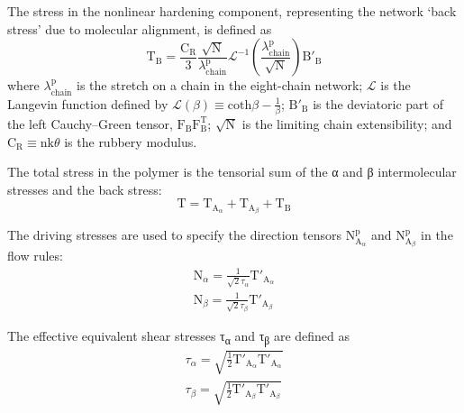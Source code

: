 \documentclass{article}
\begin{document}
The stress in the nonlinear hardening component, representing the network ‘back stress’ due to molecular alignment, is defined as
\begin{equation*}
\mathrm{T}_{\mathrm{B}} = \frac{\mathrm{C}_{\mathrm{R}}}{3}\frac{\sqrt{\mathrm{N}}}{\lambda^{\mathrm{p}}_{\mathrm{chain}}}\mathcal{L}^{-1}\left(\frac{\lambda^{\mathrm{p}}_{\mathrm{chain}}}{\sqrt{\mathrm{N}}}\right)\mathrm{B}'_{\mathrm{B}} \tag{26}
\end{equation*}
\noindent where $\lambda^{\mathrm{p}}_{\mathrm{chain}}$ is the stretch on a chain in the eight-chain network; $\mathcal{L}$ is the Langevin function defined by $\mathcal{L}(\beta) \equiv \mathrm{coth}\beta - \frac{1}{\beta}$; $\mathrm{B}'_{\mathrm{B}}$ is the deviatoric part of the left Cauchy–Green tensor, $\mathrm{F}_{\mathrm{B}}\mathrm{F}^{\mathrm{T}}_{\mathrm{B}}$; $\sqrt{\mathrm{N}}$ is the limiting chain extensibility; and $\mathrm{C}_{\mathrm{R}} \equiv \mathrm{nk}\theta$ is the rubbery modulus.

The total stress in the polymer is the tensorial sum of the α and β intermolecular stresses and the back stress:
\begin{equation*}
\mathrm{T} = \mathrm{T}_{\mathrm{A}_\alpha} + \mathrm{T}_{\mathrm{A}_\beta} + \mathrm{T}_{\mathrm{B}} \tag{27}
\end{equation*}

The driving stresses are used to specify the direction tensors $\mathrm{N}^{\mathrm{p}}_{\mathrm{A}_\alpha}$ and $\mathrm{N}^{\mathrm{p}}_{\mathrm{A}_\beta}$ in the flow rules:
\begin{gather*}
\mathrm{N}_\alpha = \frac{1}{\sqrt{2}\tau_\alpha}\mathrm{T}'_{\mathrm{A}_\alpha} \tag{28}\\
\mathrm{N}_\beta = \frac{1}{\sqrt{2}\tau_\beta}\mathrm{T}'_{\mathrm{A}_\beta} \tag{29}
\end{gather*}

The effective equivalent shear stresses τ\textsubscript{α} and τ\textsubscript{β} are defined as
\begin{gather*}
\tau_\alpha = \sqrt{\frac{1}{2}\mathrm{T}'_{\mathrm{A}_\alpha}\mathrm{T}'_{\mathrm{A}_\alpha}} \tag{30}\\
\tau_\beta = \sqrt{\frac{1}{2}\mathrm{T}'_{\mathrm{A}_\beta}\mathrm{T}'_{\mathrm{A}_\beta}} \tag{31}
\end{gather*}
\end{document}
